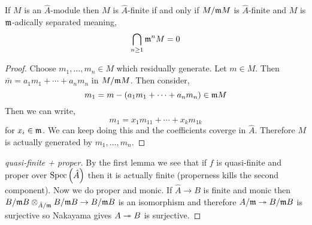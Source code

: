 \documentclass[12pt]{article}
\begin{document}
\begin{lemma}
If $M$ is an $\hat{A}$-module then $M$ is $\hat{A}$-finite if and only if $M / \mathfrak{m} M$ is $\hat{A}$-finite and $M$ is $\mathfrak{m}$-adically separated meaning,
\[ \bigcap_{n \ge 1} \mathfrak{m}^n M = 0 \]
\end{lemma}

\begin{proof}
Choose $m_1, \dots, m_n \in M$ which residually generate. Let $m \in M$. Then $\bar{m} = a_1 m_1 + \cdots + a_n m_n$ in $M / \mathfrak{m} M$. Then consider,
\[ m_1 = m - (a_1 m_1 + \cdots + a_n m_n) \in \mathfrak{m} M \]
Then we can write,
\[ m_1 = x_1 m_{11} + \cdots + x_k m_{1k} \]
for $x_i \in \mathfrak{m}$. We can keep doing this and the coefficients coverge in $\hat{A}$. Therefore $M$ is actually generated by $m_1, \dots, m_n$.
\end{proof}

\begin{proof}[quasi-finite + proper]
By the first lemma we see that if $f$ is quasi-finite and proper over $\mathrm{Spec}\left( \hat{A} \right)$ then it is actually finite (properness kills the second component). Now we do proper and monic.
If $\hat{A} \to B$ is finite and monic then $B / \mathfrak{m} B \otimes_{\hat{A} / \mathfrak{m}} B / \mathfrak{m} B \to B / \mathfrak{m} B$ is an isomorphism and therefore $A / \mathfrak{m} \twoheadrightarrow B / \mathfrak{m} B$ is surjective so Nakayama gives $A \twoheadrightarrow B$ is surjective. 
\end{proof}
\end{document}
